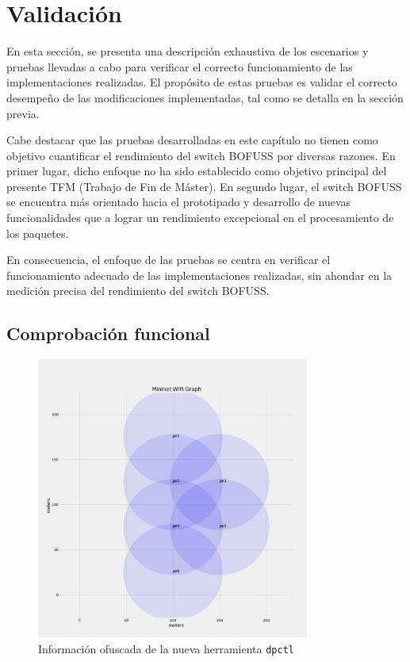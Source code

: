 \section{Validación}
\label{sec:vali}

En esta sección, se presenta una descripción exhaustiva de los escenarios y pruebas llevadas a cabo para verificar el correcto funcionamiento de las implementaciones realizadas. El propósito de estas pruebas es validar el correcto desempeño de las modificaciones implementadas, tal como se detalla en la sección previa.

Cabe destacar que las pruebas desarrolladas en este capítulo no tienen como objetivo cuantificar el rendimiento del switch BOFUSS por diversas razones. En primer lugar, dicho enfoque no ha sido establecido como objetivo principal del presente TFM (Trabajo de Fin de Máster). En segundo lugar, el switch BOFUSS se encuentra más orientado hacia el prototipado y desarrollo de nuevas funcionalidades que a lograr un rendimiento excepcional en el procesamiento de los paquetes.

En consecuencia, el enfoque de las pruebas se centra en verificar el funcionamiento adecuado de las implementaciones realizadas, sin ahondar en la medición precisa del rendimiento del switch BOFUSS.

\subsection{Comprobación funcional}


\begin{figure}[ht]
    \centering
    \includegraphics[width=0.8\textwidth]{archivos/img/dev/topo_val_mininetWifi.png}
    \caption{Información ofuscada de la nueva herramienta \texttt{dpctl}}
    \label{fig:topo_val_mininetWifi}
\end{figure}

